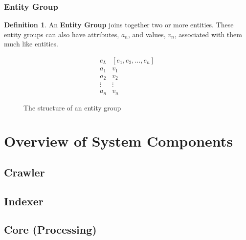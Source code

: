 \documentclass[12pt,letterpaper,oneside,draft]{report}
\theoremstyle{definition}
\newtheorem{defn}{Definition}
\begin{document}
				\subsubsection{Entity Group}
					\begin{defn}
						An \textbf{Entity Group} joins together two or more entities.  These entity groups can also have attributes, $a_n$, and values, $v_n$, associated with them much like entities.

						\begin{figure}[!ht]
							\centering
							\[
								\begin{array}{ll}
									e_L & \left[ e_1, e_2, \ldots, e_n \right] \\
									a_1 & v_1 \\
									a_2 & v_2 \\
									\vdots & \vdots \\
									a_n & v_n
								\end{array}
							\]
							\caption{The structure of an entity group}
							\label{fig:entity-group-rep}
						\end{figure}

					\end{defn}

			\section{Overview of System Components}
				\subsection{Crawler}
				\subsection{Indexer}
				\subsection{Core (Processing)}
\end{document}
